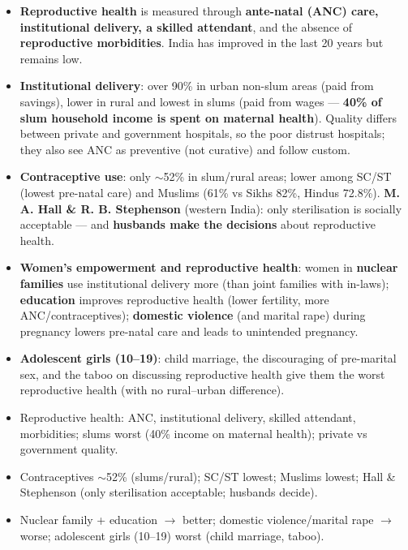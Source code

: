 \begin{KeyConcept}
\begin{itemize}
\item \textbf{Reproductive health} is measured through \textbf{ante-natal (ANC) care, institutional delivery, a skilled attendant}, and the absence of \textbf{reproductive morbidities}. India has improved in the last 20 years but remains low.
\item \textbf{Institutional delivery}: over 90\% in urban non-slum areas (paid from savings), lower in rural and lowest in slums (paid from wages --- \textbf{40\% of slum household income is spent on maternal health}). Quality differs between private and government hospitals, so the poor distrust hospitals; they also see ANC as preventive (not curative) and follow custom.
\item \textbf{Contraceptive use}: only $\sim$52\% in slum/rural areas; lower among SC/ST (lowest pre-natal care) and Muslims (61\% vs Sikhs 82\%, Hindus 72.8\%). \textbf{M. A. Hall \& R. B. Stephenson} (western India): only sterilisation is socially acceptable --- and \textbf{husbands make the decisions} about reproductive health.
\item \textbf{Women's empowerment and reproductive health}: women in \textbf{nuclear families} use institutional delivery more (than joint families with in-laws); \textbf{education} improves reproductive health (lower fertility, more ANC/contraceptives); \textbf{domestic violence} (and marital rape) during pregnancy lowers pre-natal care and leads to unintended pregnancy.
\item \textbf{Adolescent girls (10--19)}: child marriage, the discouraging of pre-marital sex, and the taboo on discussing reproductive health give them the worst reproductive health (with no rural--urban difference).
\end{itemize}
\end{KeyConcept}

\begin{QuickRevision}
\begin{itemize}
\item Reproductive health: ANC, institutional delivery, skilled attendant, morbidities; slums worst (40\% income on maternal health); private vs government quality.
\item Contraceptives $\sim$52\% (slums/rural); SC/ST lowest; Muslims lowest; Hall \& Stephenson (only sterilisation acceptable; husbands decide).
\item Nuclear family + education $\rightarrow$ better; domestic violence/marital rape $\rightarrow$ worse; adolescent girls (10--19) worst (child marriage, taboo).
\end{itemize}
\end{QuickRevision}
